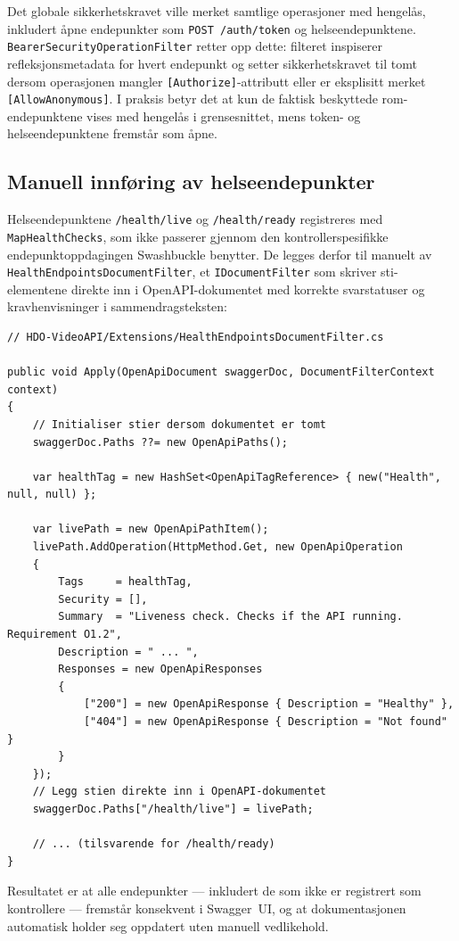 Det globale sikkerhetskravet ville merket samtlige operasjoner med hengelås, inkludert åpne endepunkter som \texttt{POST /auth/token} og helseendepunktene. \texttt{BearerSecurityOperationFilter} retter opp dette: filteret inspiserer refleksjonsmetadata for hvert endepunkt og setter sikkerhetskravet til tomt dersom operasjonen mangler \texttt{[Authorize]}-attributt eller er eksplisitt merket \texttt{[AllowAnonymous]}. I praksis betyr det at kun de faktisk beskyttede rom-endepunktene vises med hengelås i grensesnittet, mens token- og helseendepunktene fremstår som åpne.

\subsection{Manuell innføring av helseendepunkter}
\label{subsec:apidoc-health}
 
Helseendepunktene \texttt{/health/live} og \texttt{/health/ready} registreres med \texttt{MapHealthChecks}, som ikke passerer gjennom den kontrollerspesifikke endepunktoppdagingen Swashbuckle benytter. De legges derfor til manuelt av \texttt{HealthEndpointsDocumentFilter}, et \texttt{IDocumentFilter} som skriver sti-elementene direkte inn i OpenAPI-dokumentet med korrekte svarstatuser og kravhenvisninger i sammendragsteksten:
 
\begin{lstlisting}[language={[Sharp]C}, caption={Manuell innføring av helseendepunkter i OpenAPI-dokumentet.}, label={lst:swagger-health}]
// HDO-VideoAPI/Extensions/HealthEndpointsDocumentFilter.cs

public void Apply(OpenApiDocument swaggerDoc, DocumentFilterContext context)
{
    // Initialiser stier dersom dokumentet er tomt
    swaggerDoc.Paths ??= new OpenApiPaths();

    var healthTag = new HashSet<OpenApiTagReference> { new("Health", null, null) };
 
    var livePath = new OpenApiPathItem();
    livePath.AddOperation(HttpMethod.Get, new OpenApiOperation
    {
        Tags     = healthTag,
        Security = [],
        Summary  = "Liveness check. Checks if the API running. Requirement O1.2",
        Description = " ... ",
        Responses = new OpenApiResponses
        {
            ["200"] = new OpenApiResponse { Description = "Healthy" },
            ["404"] = new OpenApiResponse { Description = "Not found" }
        }
    });
    // Legg stien direkte inn i OpenAPI-dokumentet
    swaggerDoc.Paths["/health/live"] = livePath;
    
    // ... (tilsvarende for /health/ready)
}
\end{lstlisting}
 
Resultatet er at alle endepunkter — inkludert de som ikke er registrert som
kontrollere — fremstår konsekvent i Swagger~UI, og at dokumentasjonen
automatisk holder seg oppdatert uten manuell vedlikehold.